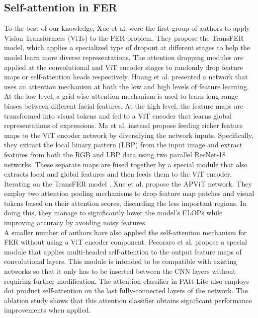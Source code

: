 \documentclass[../main.tex]{subfiles}
\begin{document}
\subsection{Self-attention in FER}

To the best of our knowledge, Xue et al. \cite{xue2021transfer} were the first group of authors to apply Vision Transformers (ViTs) to the FER problem.
They propose the TransFER model, which applies a specialized type of dropout at different stages to help the model learn more diverse representations.
The attention dropping modules are applied at the convolutional and ViT encoder stages to randomly drop feature maps or self-attention heads respectively.
Huang et al. \cite{huang2021} presented a network that uses an attention mechanism at both the low and high levels of feature learning.
At the low level, a grid-wise attention mechanism is used to learn long-range biases between different facial features.
At the high level, the feature maps are transformed into visual tokens and fed to a ViT encoder that learns global representations of expressions.
Ma et al. \cite{ma2023asf} instead propose feeding richer feature maps to the ViT encoder network by diversifying the network inputs.
Specifically, they extract the local binary pattern (LBP) from the input image and extract features from both the RGB and LBP data using two parallel ResNet-18 networks.
These separate maps are fused together by a special module that also extracts local and global features and then feeds them to the ViT encoder.
Iterating on the TransFER model \cite{apvit2023}, Xue et al. propose the APViT network.
They employ two attention pooling mechanisms to drop feature map patches and visual tokens based on their attention scores, discarding the less important regions.
In doing this, they manage to significantly lower the model's FLOPs while improving accuracy by avoiding noisy features.\\

A smaller number of authors have also applied the self-attention mechanism for FER without using a ViT encoder component.
Pecoraro et al. \cite{pecoraro2022lhc} propose a special module that applies multi-headed self-attention to the output feature maps of convolutional layers.
This module is intended to be compatible with existing networks so that it only has to be inserted between the CNN layers without requiring further modification.
The attention classifier in PAtt-Lite \cite{lengwe2023pattlite} also employs dot product self-attention on the last fully-connected layers of the network.
The ablation study shows that this attention classifier obtains significant performance improvements when applied.
\end{document}
